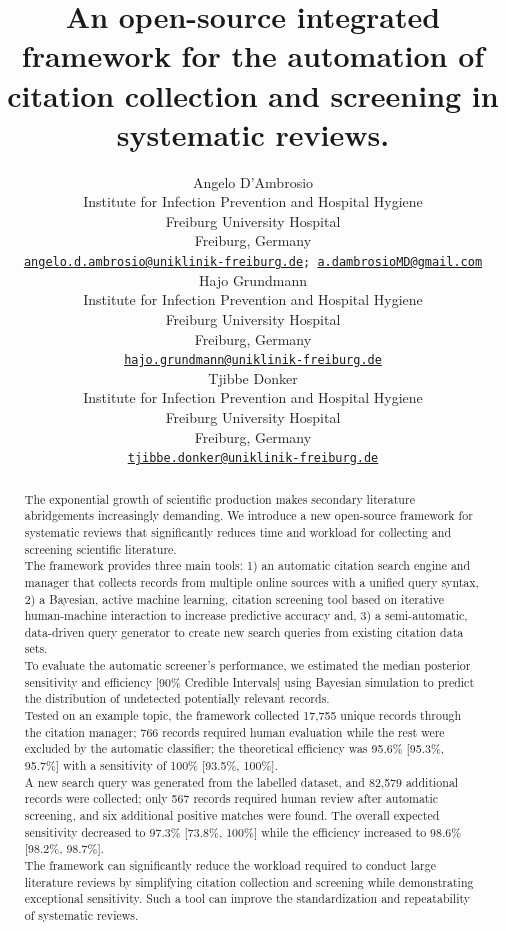\documentclass{article}
\title{An open-source integrated framework for the automation of
citation collection and screening in systematic reviews.}
\author{
    Angelo D'Ambrosio
   \\
    Institute for Infection Prevention and Hospital Hygiene \\
    Freiburg University Hospital \\
  Freiburg, Germany \\
  \texttt{\href{mailto:angelo.d.ambrosio@uniklinik-freiburg.de}{\nolinkurl{angelo.d.ambrosio@uniklinik-freiburg.de}};
\href{mailto:a.dambrosioMD@gmail.com}{\nolinkurl{a.dambrosioMD@gmail.com}}} \\
   \And
    Hajo Grundmann
   \\
    Institute for Infection Prevention and Hospital Hygiene \\
    Freiburg University Hospital \\
  Freiburg, Germany \\
  \texttt{\href{mailto:hajo.grundmann@uniklinik-freiburg.de}{\nolinkurl{hajo.grundmann@uniklinik-freiburg.de}}} \\
   \And
    Tjibbe Donker
   \\
    Institute for Infection Prevention and Hospital Hygiene \\
    Freiburg University Hospital \\
  Freiburg, Germany \\
  \texttt{\href{mailto:tjibbe.donker@uniklinik-freiburg.de}{\nolinkurl{tjibbe.donker@uniklinik-freiburg.de}}} \\
  }
\begin{document}
\maketitle


\begin{abstract}
The exponential growth of scientific production makes secondary
literature abridgements increasingly demanding. We introduce a new
open-source framework for systematic reviews that significantly reduces
time and workload for collecting and screening scientific literature.\\
The framework provides three main tools: 1) an automatic citation search
engine and manager that collects records from multiple online sources
with a unified query syntax, 2) a Bayesian, active machine learning,
citation screening tool based on iterative human-machine interaction to
increase predictive accuracy and, 3) a semi-automatic, data-driven query
generator to create new search queries from existing citation data
sets.\\
To evaluate the automatic screener's performance, we estimated the
median posterior sensitivity and efficiency {[}90\% Credible
Intervals{]} using Bayesian simulation to predict the distribution of
undetected potentially relevant records.\\
Tested on an example topic, the framework collected 17,755 unique
records through the citation manager; 766 records required human
evaluation while the rest were excluded by the automatic classifier; the
theoretical efficiency was 95.6\% {[}95.3\%, 95.7\%{]} with a
sensitivity of 100\% {[}93.5\%, 100\%{]}.\\
A new search query was generated from the labelled dataset, and 82,579
additional records were collected; only 567 records required human
review after automatic screening, and six additional positive matches
were found. The overall expected sensitivity decreased to 97.3\%
{[}73.8\%, 100\%{]} while the efficiency increased to 98.6\% {[}98.2\%,
98.7\%{]}.\\
The framework can significantly reduce the workload required to conduct
large literature reviews by simplifying citation collection and
screening while demonstrating exceptional sensitivity. Such a tool can
improve the standardization and repeatability of systematic reviews.
\end{abstract}

\end{document}
